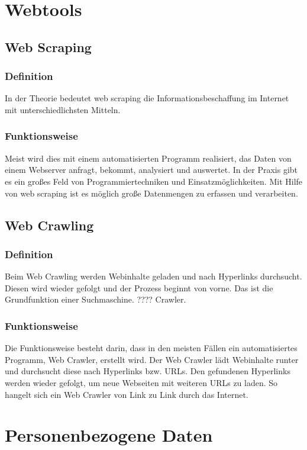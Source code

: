 \section{Webtools}
	\subsection{Web Scraping}
		\subsubsection{Definition}
		In der Theorie bedeutet web scraping die Informationsbeschaffung im Internet mit unterschiedlichsten Mitteln. \cite{WebScraping}
		\subsubsection{Funktionsweise}
		Meist wird dies mit einem automatisierten Programm realisiert, das Daten von einem Webserver anfragt, bekommt, analysiert und auswertet. 
		In der Praxis gibt es ein großes Feld von Programmiertechniken und Einsatzmöglichkeiten.
		Mit Hilfe von web scraping ist es möglich große Datenmengen zu erfassen und verarbeiten.\cite{WebScraping}

	\subsection{Web Crawling}
		\subsubsection{Definition}
		Beim Web Crawling werden Webinhalte geladen und nach Hyperlinks durchsucht. Diesen wird wieder gefolgt und der Prozess beginnt von vorne. Das ist die Grundfunktion einer Suchmaschine. ???? Crawler.\cite{WebScraping}
		\subsubsection{Funktionsweise}
		Die Funktionsweise besteht darin, dass in den meisten Fällen ein automatisiertes Programm, Web Crawler, erstellt wird. Der Web Crawler lädt Webinhalte runter und durchsucht diese nach Hyperlinks bzw. URLs. Den gefundenen Hyperlinks werden wieder gefolgt, um neue Webseiten mit weiteren URLs zu laden. So hangelt sich ein Web Crawler von Link zu Link durch das Internet.\cite{WebScraping}

\section{Personenbezogene Daten}
